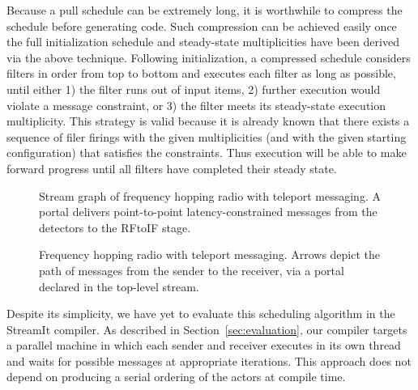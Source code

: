 Because a pull schedule can be extremely long, it is worthwhile to
compress the schedule before generating code.  Such compression can be
achieved easily once the full initialization schedule and steady-state
multiplicities have been derived via the above technique.  Following
initialization, a compressed schedule considers filters in order from
top to bottom and executes each filter as long as possible, until
either 1) the filter runs out of input items, 2) further execution
would violate a message constraint, or 3) the filter meets its
steady-state execution multiplicity.  This strategy is valid because
it is already known that there exists a sequence of filer firings with
the given multiplicities (and with the given starting configuration)
that satisfies the constraints.  Thus execution will be able to make
forward progress until all filters have completed their steady state.

\begin{figure}[t]
\centering
{}
\vspace{-6pt}
\caption[Stream graph of frequency hopping radio with teleport
  messaging.]{Stream graph of frequency hopping radio with
  teleport messaging.  A portal delivers point-to-point
  latency-constrained messages from the detectors to the RFtoIF stage.
  \protect\label{fig:fhr-streamit}}
\vspace{-12pt}
\end{figure}

\begin{figure}[t]
\centering
\hspace{-0.2in}
\vspace{-6pt}
\caption[Code for frequency hopping radio with teleport
  messaging.]{Frequency hopping radio with teleport messaging.
  Arrows depict the path of messages from the sender to the receiver,
  via a portal declared in the top-level stream.
  \protect\label{fig:freq1}}
\vspace{-8pt}
\end{figure}

Despite its simplicity, we have yet to evaluate this scheduling
algorithm in the StreamIt compiler.  As described in
Section~\ref{sec:evaluation}, our compiler targets a parallel machine
in which each sender and receiver executes in its own thread and waits
for possible messages at appropriate iterations.  This approach does
not depend on producing a serial ordering of the actors at compile
time.

